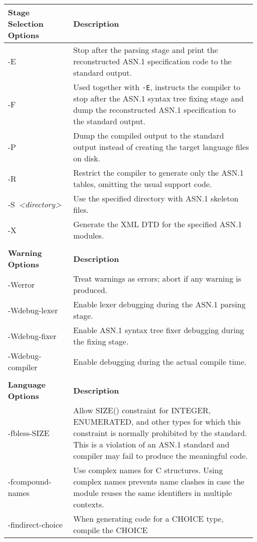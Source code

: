 \documentclass[english,oneside,12pt]{book}
\begin{document}
\renewcommand{\arraystretch}{1.33}
\begin{longtable}{lp{4in}}
\textbf{Stage Selection Options} & \textbf{Description}\\
\midrule
{\ttfamily -E} & {\small Stop after the parsing stage and print the reconstructed ASN.1
specification code to the standard output.}\\
{\ttfamily -F} & {\small Used together with \texttt{-E}, instructs the compiler to stop after
the ASN.1 syntax tree fixing stage and dump the reconstructed ASN.1
specification to the standard output.}\\
{\ttfamily -P} & {\small Dump the compiled output to the standard output instead of
creating the target language files on disk.}\\
{\ttfamily -R} & {\small Restrict the compiler to generate only the ASN.1 tables, omitting the usual support code.}\\
{\ttfamily -S~\emph{<directory>}} & {\small Use the specified directory with ASN.1 skeleton files.}\\
{\ttfamily -X} & {\small Generate the XML DTD for the specified ASN.1 modules.}\\\\
\textbf{Warning Options} & \textbf{Description}\\
\midrule
{\ttfamily -Werror} & {\small Treat warnings as errors; abort if any warning is produced.}\\
{\ttfamily -Wdebug-lexer} & {\small Enable lexer debugging during the ASN.1 parsing stage.}\\
{\ttfamily -Wdebug-fixer} & {\small Enable ASN.1 syntax  tree  fixer  debugging  during  the fixing stage.}\\
{\ttfamily -Wdebug-compiler} & {\small Enable debugging during the actual compile time.}\\  \\
\textbf{Language Options} & \textbf{Description}\\
\midrule
{\ttfamily -fbless-SIZE} & {\small Allow SIZE() constraint for INTEGER, ENUMERATED, and other types for which this constraint is normally prohibited by the standard.
This is a violation of an ASN.1 standard and compiler may fail to produce the meaningful code.}\\
{\ttfamily -fcompound-names} & {\small Use complex names for C structures. Using complex names prevents
name clashes in case the module reuses the same identifiers in multiple
contexts.}\\
{\ttfamily -findirect-choice} & {\small When generating code for a CHOICE type, compile the CHOICE
}
\end{longtable}
\end{document}
